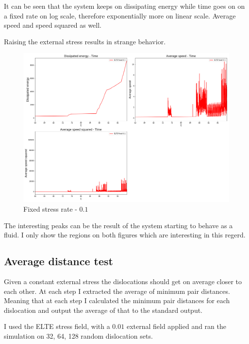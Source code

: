 \documentclass[12pt,a4paper]{article}
\theoremstyle{plain}
\begin{document}
\begin{multicols*}{2}
	\par It can be seen that the system keeps on dissipating energy while time goes on
	on a fixed rate on log scale, therefore exponentially more on linear scale. Average
	speed and speed squared as well.

	\par Raising the external stress results in strange behavior.

	\begin{figure}[H]
		\centering
		\includegraphics[width=0.99\columnwidth]{all_elte_fixed_0_1.png}
		\caption{Fixed stress rate - $0.1$}
	\end{figure}

	\par The interesting peaks can be the result of the system starting to behave
	as a fluid. I only show the regions on both figures which are interesting in this
	regerd.

	\subsection{Average distance test}

	\par Given a constant external stress the dislocations should get on average closer
	to each other. At each step I extracted the average of minimum pair distances. Meaning that at each step
	I calculated the minimum pair distances for each dislocation and output the average of that to
	the standard output.

	\par I used the ELTE stress field, with a $0.01$ external field applied and ran
	the simulation on 32, 64, 128 random dislocation sets.


\end{multicols*}
\end{document}
